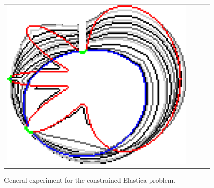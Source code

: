 \begin{figure}
\begin{tabular}{cccc}
\includegraphics[scale=0.25]{figures/chapter9/constrained-elastica/graphflow/flower-2/len_pen-0.0002/radius-15/N-1/h1.0/summary.pdf}\\
\end{tabular}
\caption{General experiment for the constrained Elastica problem.}
\label{fig:results-constrained-elastica-general}
\end{figure}

